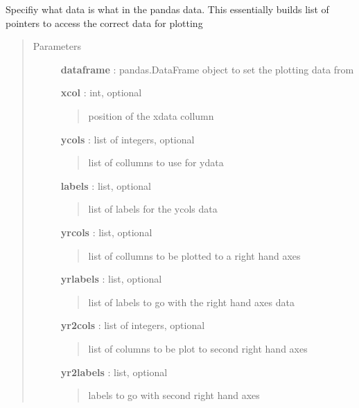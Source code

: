 \documentclass[letterpaper,10pt,english]{sphinxmanual}
\begin{document}
\begin{fulllineitems}
\begin{fulllineitems}
\label{pubplots:pubplots.plotdata.PlotData.prepare_frame}
Specifiy what data is what in the pandas data. This essentially builds list of
pointers to access the correct data for plotting
\begin{quote}\begin{description}
\item[{Parameters}] \leavevmode
\textbf{dataframe} : pandas.DataFrame object to set the plotting data from

\textbf{xcol} : int, optional
\begin{quote}

position of the xdata collumn
\end{quote}

\textbf{ycols} : list of integers, optional
\begin{quote}

list of collumns to use for ydata
\end{quote}

\textbf{labels} : list, optional
\begin{quote}

list of labels for the ycols data
\end{quote}

\textbf{yrcols} : list, optional
\begin{quote}

list of collumns to be plotted to a right hand axes
\end{quote}

\textbf{yrlabels} : list, optional
\begin{quote}

list of labels to go with the right hand axes data
\end{quote}

\textbf{yr2cols} : list of integers, optional
\begin{quote}

list of columns to be plot to second right hand axes
\end{quote}

\textbf{yr2labels} : list, optional
\begin{quote}

labels to go with second right hand axes
\end{quote}


\end{description}
\end{quote}
\end{fulllineitems}
\end{fulllineitems}
\end{document}
